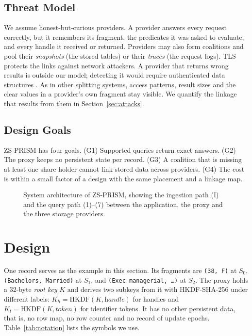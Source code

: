 \documentclass[conference]{IEEEtran}
\newcommand{\sys}{ZS-PRISM}
\begin{document}
\subsection{Threat Model}
We assume honest-but-curious providers. A provider answers every request correctly, but it remembers its fragment, the predicates it was asked to evaluate, and every handle it received or returned. Providers may also form coalitions and pool their \emph{snapshots} (the stored tables) or their \emph{traces} (the request logs). TLS protects the links against network attackers. A provider that returns wrong results is outside our model; detecting it would require authenticated data structures \cite{li2006authenticated}. As in other splitting systems, access patterns, result sizes and the clear values in a provider's own fragment stay visible. We quantify the linkage that results from them in Section~\ref{sec:attacks}.

\subsection{Design Goals}
\sys{} has four goals. (G1) Supported queries return exact answers. (G2) The proxy keeps no persistent state per record. (G3) A coalition that is missing at least one share holder cannot link stored data across providers. (G4) The cost is within a small factor of a design with the same placement and a linkage map.

\begin{figure}[t]
\centering
\resizebox{\textwidth}{!}{}
\caption{System architecture of \sys{}, showing the ingestion path (I) and the query path (1)--(7) between the application, the proxy and the three storage providers.}
\label{fig:arch}
\end{figure}

\section{Design}\label{sec:design}
One record serves as the example in this section. Its fragments are \texttt{(38, F)} at $S_0$, \texttt{(Bachelors, Married)} at $S_1$, and \texttt{(Exec-managerial, \dots)} at $S_2$. The proxy holds a 32-byte \emph{root key} $K$ and derives two subkeys from it with HKDF-SHA-256 \cite{rfc5869} under different labels: $K_h=\mathrm{HKDF}(K,\textit{handle})$ for handles and $K_t=\mathrm{HKDF}(K,\textit{token})$ for identifier tokens. It has no other persistent data, that is, no row map, no row counter and no record of update epochs. Table~\ref{tab:notation} lists the symbols we use.
\end{document}
